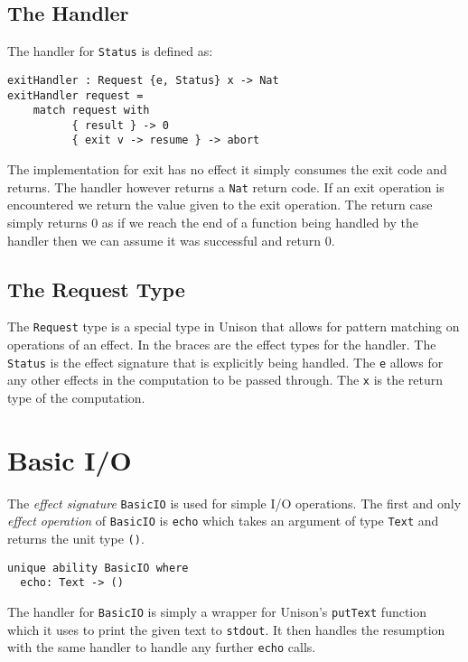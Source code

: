 \documentclass[logo,bsc,singlespacing,parskip]{infthesis}
\begin{document}
\subsection{The Handler}

The handler for \texttt{Status} is defined as:

\begin{lstlisting}[language=unison]
exitHandler : Request {e, Status} x -> Nat
exitHandler request =
    match request with
          { result } -> 0
          { exit v -> resume } -> abort
\end{lstlisting}

The implementation for exit has no effect it simply consumes the exit code and
returns. The handler however returns a \texttt{Nat} return code. If an exit
operation is encountered we return the value given to the exit operation. The
return case simply returns 0 as if we reach the end of a function being handled
by the handler then we can assume it was successful and return 0.


\subsection{The Request Type}

The \texttt{Request} type is a special type in Unison that allows for pattern
matching on operations of an effect. In the braces are the effect types for the
handler. The \texttt{Status} is the effect signature that is explicitly being
handled. The \texttt{e} allows for any other effects in the computation to be
passed through. The \texttt{x} is the return type of the computation.

\section{Basic I/O}
\label{io}

The \emph{effect signature} \texttt{BasicIO} is used for simple I/O operations.
The first and only \emph{effect operation} of \texttt{BasicIO} is \texttt{echo}
which takes an argument of type \texttt{Text} and returns the unit
type \texttt{()}. 

\begin{lstlisting}[language=unison]
unique ability BasicIO where
  echo: Text -> ()
\end{lstlisting}

The handler for \texttt{BasicIO} is simply a wrapper for Unison's
\texttt{putText} function which it uses to print the given text to
\texttt{stdout}. It then handles the resumption with the same handler to handle
any further \texttt{echo} calls.
\end{document}
